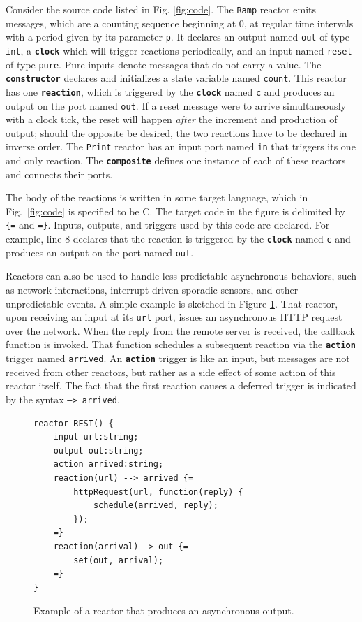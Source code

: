 \documentclass[sigconf]{acmart}
\newcommand{\marten}[1]{\mynote{Marten}{#1}{cyan}}%
\newcommand{\keyword}[1]{\texttt{\textbf{#1}}}
\begin{document}
Consider the source code listed in Fig. \ref{fig:code}. 
The \texttt{Ramp} reactor emits messages, which are a counting sequence beginning at 0, at regular time intervals
with a period given by its parameter \texttt{p}.
\marten{Review:} It declares an output named \texttt{out} of type \texttt{int}, a
\keyword{clock} which will trigger reactions periodically, and an input named {\tt reset} of type {\tt pure}. Pure inputs denote messages that do not carry a value. 
The \keyword{constructor} declares and initializes a state variable named \texttt{count}.
This reactor has one \keyword{reaction}, which is triggered by the \keyword{clock} named \texttt{c} and produces
an output on the port named \texttt{out}. \marten{Review:} If a reset message were to arrive simultaneously with a clock tick, the reset will happen \emph{after} the increment and production of output; should the opposite be desired, the two reactions have to be declared in inverse order.
The \texttt{Print} reactor has an input port named \texttt{in} that triggers its one and only reaction.
The \keyword{composite} defines one instance of each of these reactors and connects their ports.

The body of the reactions is written in some target language, which in Fig.~\ref{fig:code} is specified to be C.
The target code in the figure is delimited by {\tt \{=} and {\tt =\}}.
Inputs, outputs, and triggers used by this code are declared.
For example, line 8 declares that the reaction is triggered by the \keyword{clock} named \texttt{c} and
produces an output on the port named \texttt{out}.

Reactors can also be used to handle less predictable asynchronous behaviors,
such as network interactions, interrupt-driven sporadic sensors, and other unpredictable events.
A simple example is sketched in Figure \ref{fig:async}.
That reactor, upon receiving an input at its \texttt{url} port,
issues an asynchronous HTTP request over the network.
When the reply from the remote server is received, the callback function is invoked.
That function schedules a subsequent reaction via the \keyword{action} trigger named \texttt{arrived}.
An \keyword{action} trigger is like an input, but messages are not received from other reactors,
but rather as a side effect of some action of this reactor itself.
The fact that the first reaction causes a deferred trigger is indicated by the syntax \texttt{--> arrived}.

\begin{figure}[ht]
\begin{lstlisting}[language=LF]
reactor REST() {
	input url:string;
	output out:string;
	action arrived:string;
	reaction(url) --> arrived {=
		httpRequest(url, function(reply) {
			schedule(arrived, reply);
		});
	=}
	reaction(arrival) -> out {=
		set(out, arrival);
	=}
}
\end{lstlisting}
 \caption{Example of a reactor that produces an asynchronous output.}
 \label{fig:async}
\end{figure}
\end{document}
